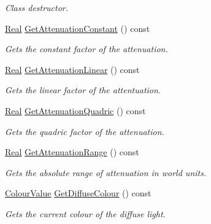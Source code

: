 \begin{DoxyCompactItemize}
\begin{DoxyCompactList}\small\item\em Class destructor. \item\end{DoxyCompactList}\item 
\hyperlink{namespaceMezzanine_a726731b1a7df72bf3583e4a97282c6f6}{Real} \hyperlink{classMezzanine_1_1Light_a9564b933f74967b89b144650abe75a48}{GetAttenuationConstant} () const 
\begin{DoxyCompactList}\small\item\em Gets the constant factor of the attenuation. \item\end{DoxyCompactList}\item 
\hyperlink{namespaceMezzanine_a726731b1a7df72bf3583e4a97282c6f6}{Real} \hyperlink{classMezzanine_1_1Light_aeb3f9b4ce95a43fe9253dc455e83f45e}{GetAttenuationLinear} () const 
\begin{DoxyCompactList}\small\item\em Gets the linear factor of the attentuation. \item\end{DoxyCompactList}\item 
\hyperlink{namespaceMezzanine_a726731b1a7df72bf3583e4a97282c6f6}{Real} \hyperlink{classMezzanine_1_1Light_a89f2ed0a02bf28bacad1569877e35a78}{GetAttenuationQuadric} () const 
\begin{DoxyCompactList}\small\item\em Gets the quadric factor of the attenuation. \item\end{DoxyCompactList}\item 
\hyperlink{namespaceMezzanine_a726731b1a7df72bf3583e4a97282c6f6}{Real} \hyperlink{classMezzanine_1_1Light_af94876bf25ec03b1cf34daeff1ffecd3}{GetAttenuationRange} () const 
\begin{DoxyCompactList}\small\item\em Gets the absolute range of attenuation in world units. \item\end{DoxyCompactList}\item 
\hyperlink{classMezzanine_1_1ColourValue}{ColourValue} \hyperlink{classMezzanine_1_1Light_af21912b8f7421f79bc8a24e7127b8d51}{GetDiffuseColour} () const 
\begin{DoxyCompactList}\small\item\em Gets the current colour of the diffuse light. \item\end{DoxyCompactList}\item 

\end{DoxyCompactItemize}
